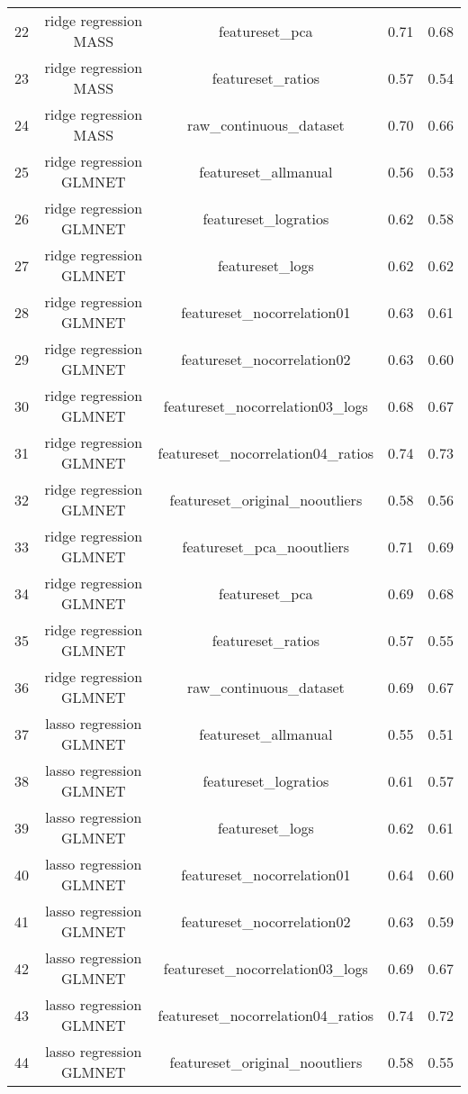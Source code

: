\begin{tabular}{ccccc}
  22 & ridge regression MASS & featureset\_pca & 0.71 & 0.68 \\ 
  23 & ridge regression MASS & featureset\_ratios & 0.57 & 0.54 \\ 
  24 & ridge regression MASS & raw\_continuous\_dataset & 0.70 & 0.66 \\ 
  25 & ridge regression GLMNET & featureset\_allmanual & 0.56 & 0.53 \\ 
  26 & ridge regression GLMNET & featureset\_logratios & 0.62 & 0.58 \\ 
  27 & ridge regression GLMNET & featureset\_logs & 0.62 & 0.62 \\ 
  28 & ridge regression GLMNET & featureset\_nocorrelation01 & 0.63 & 0.61 \\ 
  29 & ridge regression GLMNET & featureset\_nocorrelation02 & 0.63 & 0.60 \\ 
  30 & ridge regression GLMNET & featureset\_nocorrelation03\_logs & 0.68 & 0.67 \\ 
  31 & ridge regression GLMNET & featureset\_nocorrelation04\_ratios & 0.74 & 0.73 \\ 
  32 & ridge regression GLMNET & featureset\_original\_nooutliers & 0.58 & 0.56 \\ 
  33 & ridge regression GLMNET & featureset\_pca\_nooutliers & 0.71 & 0.69 \\ 
  34 & ridge regression GLMNET & featureset\_pca & 0.69 & 0.68 \\ 
  35 & ridge regression GLMNET & featureset\_ratios & 0.57 & 0.55 \\ 
  36 & ridge regression GLMNET & raw\_continuous\_dataset & 0.69 & 0.67 \\ 
  37 & lasso regression GLMNET & featureset\_allmanual & 0.55 & 0.51 \\ 
  38 & lasso regression GLMNET & featureset\_logratios & 0.61 & 0.57 \\ 
  39 & lasso regression GLMNET & featureset\_logs & 0.62 & 0.61 \\ 
  40 & lasso regression GLMNET & featureset\_nocorrelation01 & 0.64 & 0.60 \\ 
  41 & lasso regression GLMNET & featureset\_nocorrelation02 & 0.63 & 0.59 \\ 
  42 & lasso regression GLMNET & featureset\_nocorrelation03\_logs & 0.69 & 0.67 \\ 
  43 & lasso regression GLMNET & featureset\_nocorrelation04\_ratios & 0.74 & 0.72 \\ 
  44 & lasso regression GLMNET & featureset\_original\_nooutliers & 0.58 & 0.55 \\ 

\end{tabular}
